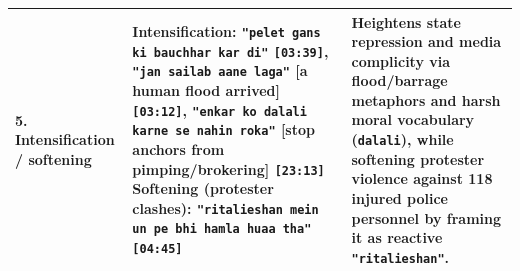 \documentclass[10pt,a4paper]{article}
\begin{document}
\begin{longtable}{@{}>{\raggedright\arraybackslash}p{} >{\raggedright\arraybackslash}p{} >{\raggedright\arraybackslash}p{}@{}}
\addlinespace[4pt]
\textbf{5. Intensification / softening} & \textbf{Intensification:} \texttt{"pelet gans ki bauchhar kar di"} \texttt{[03:39]}, \texttt{"jan sailab aane laga"} [a human flood arrived] \texttt{[03:12]}, \texttt{"enkar ko dalali karne se nahin roka"} [stop anchors from pimping/brokering] \texttt{[23:13]} \newline  \textbf{Softening (protester clashes):} \texttt{"ritalieshan mein un pe bhi hamla huaa tha"} \texttt{[04:45]} & Heightens state repression and media complicity via flood/barrage metaphors and harsh moral vocabulary (\texttt{dalali}), while softening protester violence against 118 injured police personnel by framing it as reactive \texttt{"ritalieshan"}. \\
\bottomrule
\end{longtable}
\end{document}

